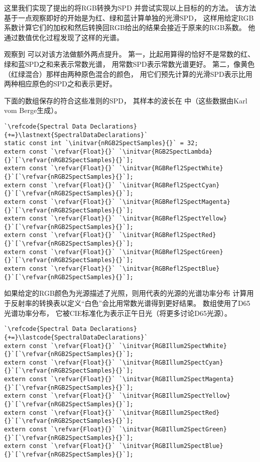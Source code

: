 这里我们实现了\citet{doi:10.1080/10867651.1999.10487511}提出的将RGB转换为SPD
并尝试实现以上目标的的方法。
该方法基于一点观察即好的开始是为红、绿和蓝计算单独的光滑SPD，
这样用给定RGB系数计算它们的加权和然后转换回RGB给出的结果会接近于原来的RGB系数。
他通过数值优化过程发现了这样的光谱。

\citeauthor{doi:10.1080/10867651.1999.10487511}观察到
可以对该方法做额外两点提升。
第一，比起用算得的恰好不是常数的红、绿和蓝SPD之和来表示常数光谱，
用常数SPD表示常数光谱更好。
第二，像黄色（红绿混合）那样由两种原色混合的颜色，
用它们预先计算的光滑SPD表示比用两种相应原色的SPD之和表示更好。

下面的数组保存的符合这些准则的SPD，
其样本的波长在
中（这些数据由Karl vom Berge生成）。
\begin{lstlisting}
`\refcode{Spectral Data Declarations}{+=}\lastnext{SpectralDataDeclarations}`
static const int `\initvar{nRGB2SpectSamples}{}` = 32;
extern const `\refvar{Float}{}` `\initvar{RGB2SpectLambda}{}`[`\refvar{nRGB2SpectSamples}{}`];
extern const `\refvar{Float}{}` `\initvar{RGBRefl2SpectWhite}{}`[`\refvar{nRGB2SpectSamples}{}`];
extern const `\refvar{Float}{}` `\initvar{RGBRefl2SpectCyan}{}`[`\refvar{nRGB2SpectSamples}{}`];
extern const `\refvar{Float}{}` `\initvar{RGBRefl2SpectMagenta}{}`[`\refvar{nRGB2SpectSamples}{}`];
extern const `\refvar{Float}{}` `\initvar{RGBRefl2SpectYellow}{}`[`\refvar{nRGB2SpectSamples}{}`];
extern const `\refvar{Float}{}` `\initvar{RGBRefl2SpectRed}{}`[`\refvar{nRGB2SpectSamples}{}`];
extern const `\refvar{Float}{}` `\initvar{RGBRefl2SpectGreen}{}`[`\refvar{nRGB2SpectSamples}{}`];
extern const `\refvar{Float}{}` `\initvar{RGBRefl2SpectBlue}{}`[`\refvar{nRGB2SpectSamples}{}`];
\end{lstlisting}

如果给定的RGB颜色为光源描述了光照，则用代表的光源的光谱功率分布
计算用于反射率的转换表以定义“白色”会比用常数光谱得到更好结果。
数组使用了D65光谱功率分布，
它被CIE标准化为表示正午日光（将更多讨论D65光源）。
\begin{lstlisting}
`\refcode{Spectral Data Declarations}{+=}\lastcode{SpectralDataDeclarations}`
extern const `\refvar{Float}{}` `\initvar{RGBIllum2SpectWhite}{}`[`\refvar{nRGB2SpectSamples}{}`];
extern const `\refvar{Float}{}` `\initvar{RGBIllum2SpectCyan}{}`[`\refvar{nRGB2SpectSamples}{}`];
extern const `\refvar{Float}{}` `\initvar{RGBIllum2SpectMagenta}{}`[`\refvar{nRGB2SpectSamples}{}`];
extern const `\refvar{Float}{}` `\initvar{RGBIllum2SpectYellow}{}`[`\refvar{nRGB2SpectSamples}{}`];
extern const `\refvar{Float}{}` `\initvar{RGBIllum2SpectRed}{}`[`\refvar{nRGB2SpectSamples}{}`];
extern const `\refvar{Float}{}` `\initvar{RGBIllum2SpectGreen}{}`[`\refvar{nRGB2SpectSamples}{}`];
extern const `\refvar{Float}{}` `\initvar{RGBIllum2SpectBlue}{}`[`\refvar{nRGB2SpectSamples}{}`];
\end{lstlisting}

